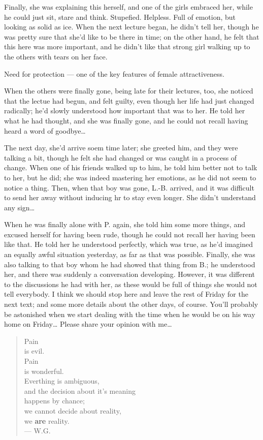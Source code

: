 Finally, she was explaining this herself, and one of the girls embraced her, while he could just sit, stare and think. Stupefied. Helpless. Full of emotion, but looking as solid as ice. 
When the next lecture began, he didn't tell her, though he was pretty sure that she'd like to be there in time; on the other hand, he felt that this here was more important, and he didn't like that strong girl walking up to the others with tears on her face.

Need for protection --- one of the key features of female attractiveness.

When the others were finally gone, being late for their lectures, too, she noticed that the lectue had begun, and felt guilty, even though her life had just changed radically; he'd slowly understood how important that was to her. He told her what he had thought, and she was finally gone, and he could not recall having heard a word of goodbye\ldots

The next day, she'd arrive soem time later; she greeted him, and they were talking a bit, though he felt she had changed or was caught in a process of change. When one of his friends walked up to him, he told him better not to talk to her, but he did; she was indeed mastering her emotions, as he did not seem to notice a thing. Then, when that boy was gone, L.-B. arrived, and it was difficult to send her away without inducing hr to stay even longer. She didn't understand any sign\ldots

When he was finally alone with P. again, she told him some more things, and excused herself for having been rude, though he could not recall her having been like that. He told her he understood perfectly, which was true, as he'd imagined an equally awful situation yesterday, as far as that was possible. Finally, she was also talking to that boy whom he had showed that thing from B.; he understood her, and there was suddenly a conversation developing. However, it was different to the discussions he had with her, as these would be full of things she would not tell everybody. 
I think we should stop here and leave the rest of Friday for the next text; and some more details about the other days, of course. You'll probably be astonished when we start dealing with the time when he would be on his way home on Friday\ldots
Please share your opinion with me\ldots

\begin{quote}
Pain \\
is evil. \\
Pain \\
is wonderful. \\
Everthing is ambiguous, \\
and the decision about it's meaning \\
happens by chance; \\
we cannot decide about reality, \\
we \textbf{are} reality. \\
--- W.G.
\end{quote}

